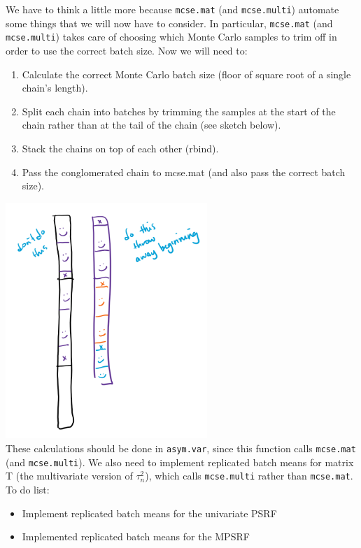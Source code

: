 \documentclass[12pt]{article}
\theoremstyle{remark}
\begin{document}
We have to think a little more because \texttt{mcse.mat} (and \texttt{mcse.multi}) automate some things that we will now have to consider. In particular, \texttt{mcse.mat} (and \texttt{mcse.multi}) takes care of choosing which Monte Carlo samples to trim off in order to use the correct batch size. Now we will need to: 
\begin{enumerate}
\item Calculate the correct Monte Carlo batch size (floor of square root of a single chain's length).
\item Split each chain into batches by trimming the samples at the start of the chain rather than at the tail of the chain (see sketch below).
\item Stack the chains on top of each other (rbind).
\item Pass the conglomerated chain to mcse.mat (and also pass the correct batch size). 
\end{enumerate}

\includegraphics[width=3in]{repBMstackchains.png}\\

These calculations should be done in \texttt{asym.var}, since this function calls \texttt{mcse.mat} (and \texttt{mcse.multi}).
We  also need to implement replicated batch means for matrix T (the multivariate version of $\tau^2_n$),  which calls \texttt{mcse.multi} rather than \texttt{mcse.mat}.\\

To do list:

\begin{itemize} \renewcommand{\labelitemi}{$\square$}
\item Implement replicated batch means for the univariate PSRF
\item Implemented replicated batch means for the MPSRF 
\end{itemize}




\end{document}
